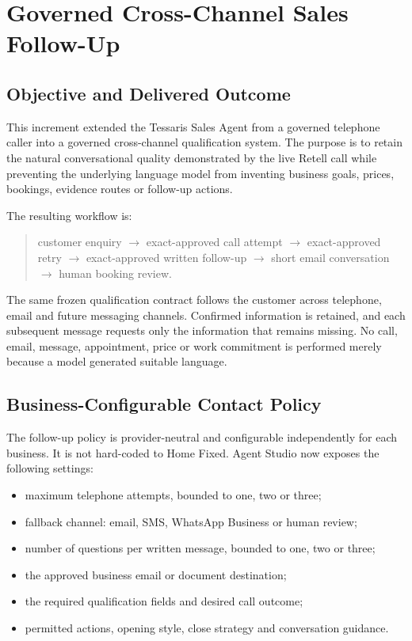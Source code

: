 
\section{Governed Cross-Channel Sales Follow-Up}
\label{sec:tessaris-governed-cross-channel-sales-followup}

\subsection{Objective and Delivered Outcome}

This increment extended the Tessaris Sales Agent from a governed telephone
caller into a governed cross-channel qualification system.  The purpose is to
retain the natural conversational quality demonstrated by the live Retell call
while preventing the underlying language model from inventing business goals,
prices, bookings, evidence routes or follow-up actions.

The resulting workflow is:

\begin{quote}
customer enquiry $\rightarrow$ exact-approved call attempt $\rightarrow$
exact-approved retry $\rightarrow$ exact-approved written follow-up
$\rightarrow$ short email conversation $\rightarrow$ human booking review.
\end{quote}

The same frozen qualification contract follows the customer across telephone,
email and future messaging channels.  Confirmed information is retained, and
each subsequent message requests only the information that remains missing.
No call, email, message, appointment, price or work commitment is performed
merely because a model generated suitable language.

\subsection{Business-Configurable Contact Policy}

The follow-up policy is provider-neutral and configurable independently for
each business.  It is not hard-coded to Home Fixed.  Agent Studio now exposes
the following settings:

\begin{itemize}[leftmargin=*]
  \item maximum telephone attempts, bounded to one, two or three;
  \item fallback channel: email, SMS, WhatsApp Business or human review;
  \item number of questions per written message, bounded to one, two or three;
  \item the approved business email or document destination;
  \item the required qualification fields and desired call outcome;
  \item permitted actions, opening style, close strategy and conversation guidance.
\end{itemize}

